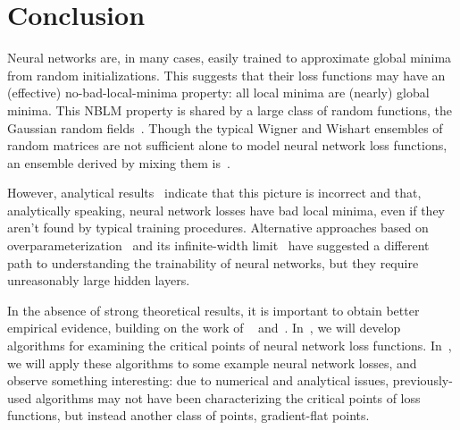\documentclass[../../thesis.tex]{subfiles}
\begin{document}
\section{Conclusion}

Neural networks are, in many cases,
easily trained to approximate global minima
from random initializations.
This suggests that their loss functions may have
an (effective) no-bad-local-minima property:
all local minima are (nearly) global minima.
This NBLM property is shared by a large class of random functions,
the Gaussian random fields~\cite{bray2007,dauphin2014}.
Though the typical Wigner and Wishart ensembles of random matrices
are not sufficient alone to model neural network loss functions,
an ensemble derived by mixing them is~\cite{pennington2017}.

However, analytical results~\cite{ding2019}
indicate that this picture is incorrect
and that, analytically speaking,
neural network losses have bad local minima,
even if they aren't found by typical training procedures.
Alternative approaches based on
overparameterization~\cite{allenzhu2018}
and its infinite-width limit~\cite{jacot2018}
have suggested a different path to understanding
the trainability of neural networks,
but they require unreasonably large hidden layers.

In the absence of strong theoretical results,
it is important to obtain better empirical evidence,
building on the work of%
~\cite{dauphin2014} and~\cite{pennington2017}.
In~,
we will develop algorithms for examining
the critical points of neural network loss functions.
In~,
we will apply these algorithms to some example
neural network losses,
and observe something interesting:
due to numerical and analytical issues,
previously-used algorithms may not have
been characterizing the critical points of loss functions,
but instead another class of points,
gradient-flat points.
\end{document}
